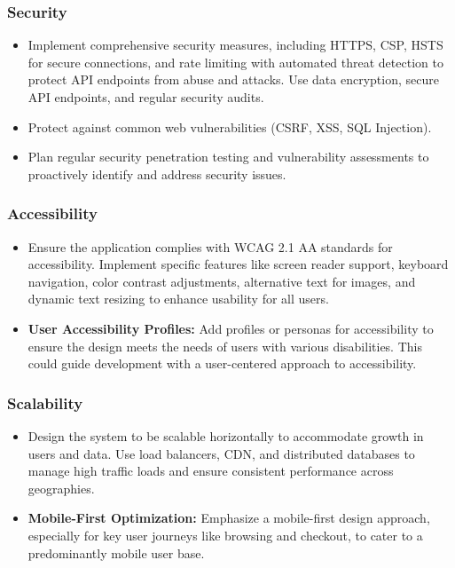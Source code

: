 \documentclass[11pt]{article}
\begin{document}
	\subsubsection*{Security}
	\begin{itemize}
		\item Implement comprehensive security measures, including HTTPS, CSP, HSTS for secure connections, and rate limiting with automated threat detection to protect API endpoints from abuse and attacks. Use data encryption, secure API endpoints, and regular security audits.
		\item Protect against common web vulnerabilities (CSRF, XSS, SQL Injection).
		\item Plan regular security penetration testing and vulnerability assessments to proactively identify and address security issues.
	\end{itemize}
	
	\subsubsection*{Accessibility}
	\begin{itemize}
		\item Ensure the application complies with WCAG 2.1 AA standards for accessibility. Implement specific features like screen reader support, keyboard navigation, color contrast adjustments, alternative text for images, and dynamic text resizing to enhance usability for all users.
		\item \textbf{User Accessibility Profiles:} Add profiles or personas for accessibility to ensure the design meets the needs of users with various disabilities. This could guide development with a user-centered approach to accessibility.
	\end{itemize}
	
	\subsubsection*{Scalability}
	\begin{itemize}
		\item Design the system to be scalable horizontally to accommodate growth in users and data. Use load balancers, CDN, and distributed databases to manage high traffic loads and ensure consistent performance across geographies.
		\item \textbf{Mobile-First Optimization:} Emphasize a mobile-first design approach, especially for key user journeys like browsing and checkout, to cater to a predominantly mobile user base.
	\end{itemize}
	
\end{document}
